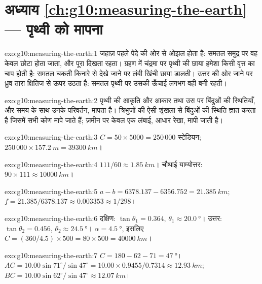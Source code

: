 \section*{अध्याय \ref{ch:g10:measuring-the-earth} --- पृथ्वी को मापना}

\begin{solution}{exo:g10:measuring-the-earth:1}
जहाज़ पहले पेंदे की ओर से ओझल होता है: समतल समुद्र पर वह केवल छोटा होता जाता, और पूरा
दिखता रहता। ग्रहण में चंद्रमा पर पृथ्वी की छाया हमेशा किसी वृत्त का चाप होती है: समतल
चकती किनारे से देखे जाने पर लंबी खिंची छाया डालती। उत्तर की ओर जाने पर ध्रुव तारा क्षितिज
से ऊपर उठता है: समतल पृथ्वी पर उसकी ऊँचाई लगभग वही बनी रहती।
\end{solution}

\begin{solution}{exo:g10:measuring-the-earth:2}
 पृथ्वी की आकृति और आकार तथा उस पर बिंदुओं की स्थितियाँ, और समय के साथ उनके
परिवर्तन, मापता है।  त्रिभुजों की ऐसी शृंखला से बिंदुओं की स्थिति ज्ञात करता है
जिसमें सभी कोण मापे जाते हैं; ज़मीन पर केवल एक लंबाई, आधार रेखा, मापी
जाती है।
\end{solution}

\begin{solution}{exo:g10:measuring-the-earth:3}
$C = 50 \times 5000 = 250\,000$ स्टेडियन; $250\,000 \times \qty{157.2}{m} =
\qty{39300}{km}$।
\end{solution}

\begin{solution}{exo:g10:measuring-the-earth:4}
$111/60 \approx \qty{1.85}{km}$। चौथाई याम्योत्तर: $90 \times 111 \approx
\qty{10000}{km}$।
\end{solution}

\begin{solution}{exo:g10:measuring-the-earth:5}
$a - b = 6378.137 - 6356.752 = \qty{21.385}{km}$;
$f = 21.385/6378.137 \approx 0.003353 \approx 1/298$।
\end{solution}

\begin{solution}{exo:g10:measuring-the-earth:6}
दक्षिण: $\tan\theta_1 = 0.364$, $\theta_1 \approx \qty{20.0}{\degree}$। उत्तर:
$\tan\theta_2 = 0.456$, $\theta_2 \approx \qty{24.5}{\degree}$।
$\alpha = \qty{4.5}{\degree}$, इसलिए $C = (360/4.5) \times 500 = 80 \times 500 =
\qty{40000}{km}$।
\end{solution}

\begin{solution}{exo:g10:measuring-the-earth:7}
$C = 180 - 62 - 71 = \qty{47}{\degree}$।
$AC = 10.00 \sin 71^\circ/\sin 47^\circ = 10.00 \times 0.9455/0.7314 \approx
\qty{12.93}{km}$; $BC = 10.00 \sin 62^\circ/\sin 47^\circ \approx
\qty{12.07}{km}$।
\end{solution}

